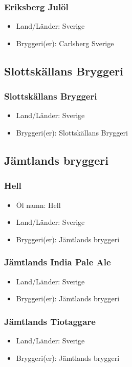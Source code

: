 \documentclass[11pt]{article}
\begin{document}
\subsubsection{Eriksberg Julöl}
\label{sec:org7bbff0c}
\begin{itemize}
\item Land/Länder: Sverige
\item Bryggeri(er): Carlsberg Sverige
\end{itemize}
\subsection{Slottskällans Bryggeri}
\label{sec:orgecd612a}
\subsubsection{Slottskällans Bryggeri}
\label{sec:org2f5789e}
\begin{itemize}
\item Land/Länder: Sverige
\item Bryggeri(er): Slottskällans Bryggeri
\end{itemize}
\subsection{Jämtlands bryggeri}
\label{sec:org0181084}
\subsubsection{Hell}
\label{sec:org953a8a7}
\begin{itemize}
\item Öl namn: Hell
\item Land/Länder: Sverige
\item Bryggeri(er): Jämtlands bryggeri
\end{itemize}
\subsubsection{Jämtlands India Pale Ale}
\label{sec:orge783f69}
\begin{itemize}
\item Land/Länder: Sverige
\item Bryggeri(er): Jämtlands bryggeri
\end{itemize}
\subsubsection{Jämtlands Tiotaggare}
\label{sec:org0456372}
\begin{itemize}
\item Land/Länder: Sverige
\item Bryggeri(er): Jämtlands bryggeri
\end{itemize}
\end{document}
